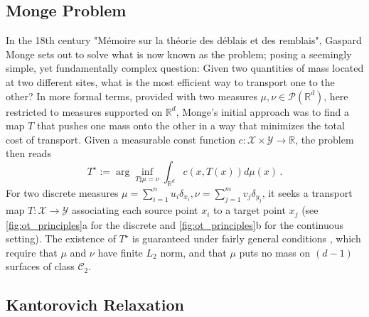 \subsection{Monge Problem} \label{sec:background_monge}

In the 18th century "M{\'e}moire sur la th{\'e}orie des d{\'e}blais et des remblais", Gaspard Monge sets out to solve what is now known as the \citeauthor{monge1781histoire} problem; posing a seemingly simple, yet fundamentally complex question: Given two quantities of mass located at two different sites, what is the most efficient way to transport one to the other?
In more formal terms, provided with two measures $\mu, \nu\in \mathcal{P}(\mathbb{R}^d)$, here restricted to measures supported on $\mathbb{R}^d$, Monge's initial approach was to find a map $T$ that pushes one mass onto the other in a way that minimizes the total cost of transport.
Given a measurable const function $c: \mathcal{X} \times \mathcal{Y} \rightarrow \mathbb{R}$, the \citeauthor{monge1781histoire} problem then reads
\begin{equation}\label{eq:monge}
T^\star := \arg\inf_{T\sharp\mu=\nu}\int_{\mathbb{R}^d} c(x, T(x)) d\mu(x)\,.
\end{equation}
For two discrete measures $\mu=\sum_{i=1}^n u_i \delta_{x_{i}}, \nu=\sum_{j=1}^m v_j \delta_{y_{j}}$, it seeks a transport map $T: \mathcal{X} \rightarrow \mathcal{Y}$ associating each source point $x_i$ to a target point $x_j$ (see \cref{fig:ot_principles}a for the discrete and \cref{fig:ot_principles}b for the continuous setting).
The existence of $T^\star$ is guaranteed under fairly general conditions \citep[Theorem 1.22]{santambrogio2015optimal}, which require that $\mu$ and $\nu$ have finite $L_2$ norm, and that $\mu$ puts no mass on $(d-1)$ surfaces of class $\mathcal{C}_2$.


\subsection{Kantorovich Relaxation} \label{sec:background_kantorovich}

